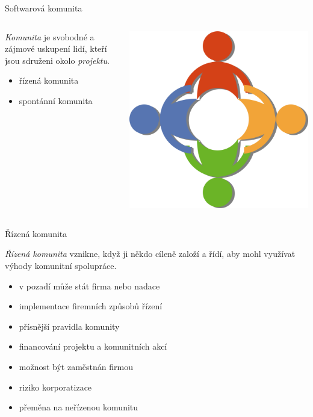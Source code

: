 \documentclass[11pt]{beamer}
\begin{document}
 \begin{frame}{Softwarová komunita}
 	\begin{columns}[T]
 		\begin{column}{0.5\textwidth}
 		 	\textit{Komunita} je svobodné a zájmové uskupení lidí, kteří jsou sdruženi okolo \textit{projektu}.
 	
 			\vspace{15pt}
 	
		 	\begin{itemize}
 				\item řízená komunita
		 		\item spontánní komunita
		 	\end{itemize}
	 	\end{column}
 		\begin{column}{0.5\textwidth}
 			\includegraphics[width=\textwidth]{images/community.png}
 		\end{column}
 	\end{columns}
 \end{frame}

 \begin{frame}{Řízená komunita}
	
	\textit{Řízená komunita} vznikne, když ji někdo cíleně založí a řídí, aby mohl využívat výhody komunitní spolupráce.
	
	\begin{itemize}
		\item v pozadí může stát firma nebo nadace
		\item implementace firemních způsobů řízení
		\item přísnější pravidla komunity
		\item financování projektu a komunitních akcí
		\item možnost být zaměstnán firmou
		\item riziko korporatizace
		\item přeměna na neřízenou komunitu
	\end{itemize}
\end{frame}
\end{document}
